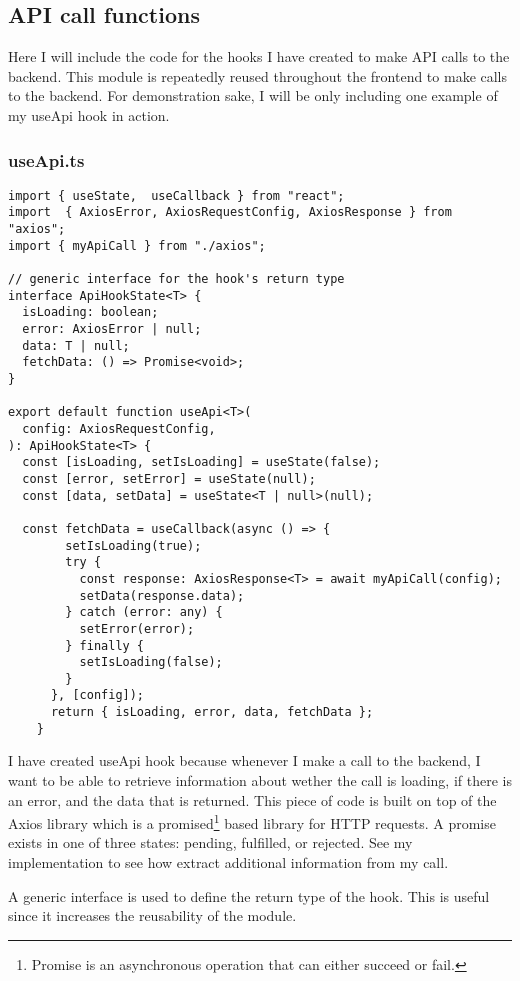 \subsection{API call functions}
Here I will include the code for the hooks I have created to make API calls to the backend. This module is repeatedly reused throughout the frontend to make calls to the backend. For demonstration sake, I will be only including one example of my useApi hook in action.

\subsubsection{useApi.ts}
\begin{verbatim}
import { useState,  useCallback } from "react";
import  { AxiosError, AxiosRequestConfig, AxiosResponse } from "axios";
import { myApiCall } from "./axios";

// generic interface for the hook's return type
interface ApiHookState<T> {
  isLoading: boolean;
  error: AxiosError | null; 
  data: T | null;
  fetchData: () => Promise<void>;
}

export default function useApi<T>(
  config: AxiosRequestConfig,
): ApiHookState<T> {
  const [isLoading, setIsLoading] = useState(false);
  const [error, setError] = useState(null);
  const [data, setData] = useState<T | null>(null);

  const fetchData = useCallback(async () => {
        setIsLoading(true);
        try {
          const response: AxiosResponse<T> = await myApiCall(config);
          setData(response.data);
        } catch (error: any) {
          setError(error);
        } finally {
          setIsLoading(false);
        }
      }, [config]);
      return { isLoading, error, data, fetchData };
    }
\end{verbatim}
I have created useApi hook because whenever I make a call to the backend, I want to be able to retrieve information about wether the call is loading, if there is an error, and the data that is returned. This piece of code is built on top of the Axios library which is a promised\footnote{Promise is an asynchronous operation that can either succeed or fail. }  based library for HTTP requests. A promise exists in one of three states: pending, fulfilled, or rejected. See my implementation to see how extract additional information from my call.

A generic interface is used to define the return type of the hook. This is useful since it increases the reusability of the module. 

